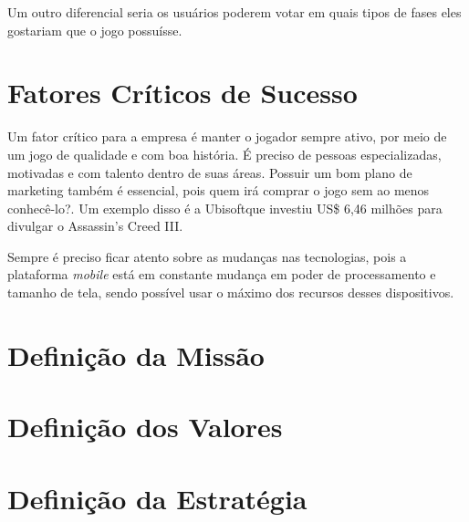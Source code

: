 \documentclass{abnt}
\begin{document}
	Um outro diferencial seria os usuários poderem votar em quais tipos de fases eles gostariam que o jogo possuísse.
	\chapter {Fatores Críticos de Sucesso}
	Um fator crítico para a empresa é manter o jogador sempre ativo, por meio de um jogo de qualidade e com boa história.
	É preciso de pessoas especializadas, motivadas e com talento dentro de suas áreas.
	Possuir um bom plano de marketing também é essencial, pois quem irá comprar o jogo sem ao menos conhecê-lo?. Um exemplo disso é a Ubisoft\texttrademark que investiu US\$ 6,46 milhões para divulgar o Assassin's Creed III.
	
	Sempre é preciso ficar atento sobre as mudanças nas tecnologias, pois a plataforma \textit{mobile} está em constante mudança em poder de processamento e tamanho de tela, sendo possível usar o máximo dos recursos desses dispositivos. 
	
	\chapter {Definição da Missão}
	
	\chapter {Definição dos Valores}

	\chapter {Definição da Estratégia}
\end{document}
